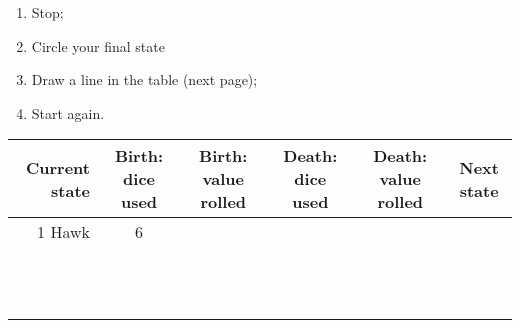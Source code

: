 \documentclass{article}
\begin{document}
\begin{enumerate}
    \item Stop;
    \item Circle your final state
    \item Draw a line in the table (next page);
    \item Start again.
\end{enumerate}

\newpage

\begin{center}
    \begin{tabular}{r|c|c|c|c|c}
        \toprule
        Current state & Birth: dice used & Birth: value rolled & Death: dice used & Death: value rolled & Next state   \\
        \midrule
        1 Hawk        & 6                &              &                  &              &              \\
                      &                  &              &                  &              &              \\
                      &                  &              &                  &              &              \\
                      &                  &              &                  &              &              \\
                      &                  &              &                  &              &              \\
                      &                  &              &                  &              &              \\
                      &                  &              &                  &              &              \\
                      &                  &              &                  &              &              \\
                      &                  &              &                  &              &              \\
                      &                  &              &                  &              &              \\
                      &                  &              &                  &              &              \\
                      &                  &              &                  &              &              \\
                      &                  &              &                  &              &              \\

\end{tabular}
\end{center}
\end{document}
